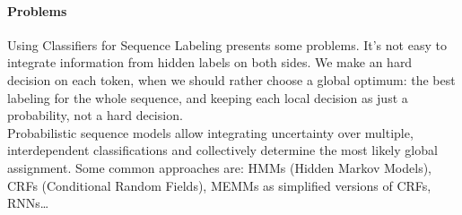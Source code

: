 \documentclass[10pt]{report}
\begin{document}
\paragraph{Problems} Using Classifiers for Sequence Labeling presents some problems. It's not easy to integrate information from hidden labels on both sides. We make an hard decision on each token, when we should rather choose a global optimum: the best labeling for the whole sequence, and keeping each local decision as just a probability, not a hard decision.\\
Probabilistic sequence models allow integrating uncertainty over multiple, interdependent classifications and collectively determine the most likely global assignment. Some common approaches are: HMMs (Hidden Markov Models), CRFs (Conditional Random Fields), MEMMs as simplified versions of CRFs, RNNs\ldots
\end{document}
